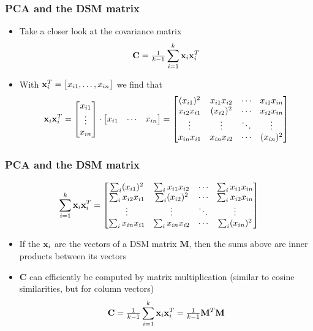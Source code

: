 \begin{frame}
  \frametitle{PCA and the DSM matrix}
  \begin{itemize}
  \item Take a closer look at the covariance matrix
    \[
    \mathbf{C} = \tfrac{1}{k-1} \sum_{i=1}^k \vx_i \vx_i^T
    \]
  \item<2-> With $\vx_i^T = \bigl[ x_{i1}, \ldots, x_{in} \bigr]$ we find that
    \[
    \vx_i \vx_i^T
    =
    \begin{bmatrix}
      x_{i1} \\ \vdots \\ x_{in}
    \end{bmatrix}
    \cdot
    \begin{bmatrix}
      x_{i1} & \cdots & x_{in}
    \end{bmatrix}    
    =
    \begin{bmatrix}
      (x_{i1})^2 & x_{i1} x_{i2} & \cdots & x_{i1} x_{in} \\
      x_{i2} x_{i1} & (x_{i2})^2 & \cdots &  x_{i2} x_{in} \\
      \vdots & \vdots & \ddots & \vdots \\
      x_{in} x_{i1} & x_{in} x_{i2} & \cdots & (x_{in})^2
    \end{bmatrix}
    \]
  \end{itemize}
\end{frame}

\begin{frame}
  \frametitle{PCA and the DSM matrix}
  \[
  \sum_{i=1}^k \vx_i \vx_i^T
  =
  \begin{bmatrix}
    \sum_i (x_{i1})^2 & \sum_i x_{i1} x_{i2} & \cdots & \sum_i x_{i1} x_{in} \\
    \sum_i x_{i2} x_{i1} & \sum_i (x_{i2})^2 & \cdots & \sum_i x_{i2} x_{in} \\
    \vdots & \vdots & \ddots & \vdots \\
    \sum_i x_{in} x_{i1} & \sum_i x_{in} x_{i2} & \cdots & \sum_i (x_{in})^2
  \end{bmatrix}
  \]
  \begin{itemize}
  \item<2-> If the $\vx_i$ are the  vectors of a DSM matrix
    $\mathbf{M}$, then the sums above are inner products between its
     vectors 
  \item<3->[\So] $\mathbf{C}$ can efficiently be computed by matrix multiplication
    (similar to cosine similarities, but for column vectors)
    \[
    \mathbf{C} = \tfrac{1}{k-1} \sum_{i=1}^k \vx_i \vx_i^T
    = \tfrac{1}{k-1} \mathbf{M}^T \mathbf{M}
    \]
  \end{itemize}
\end{frame}

